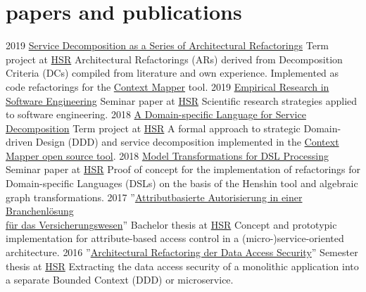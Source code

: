 \documentclass[]{cv-style}
\begin{document}
\section{papers and publications}

\begin{entrylist}
\entry
{2019}
{\href{https://eprints.hsr.ch/784/}{Service Decomposition as a Series of Architectural Refactorings}}
{Term project at \href{https://www.hsr.ch}{HSR}}
{Architectural Refactorings (ARs) derived from Decomposition Criteria (DCs) compiled from literature and own experience. Implemented as code refactorings for the \href{https://contextmapper.github.io/}{Context Mapper} tool.}
\entry
{2019}
{\href{https://github.com/stefan-ka/papers-and-publications/raw/master/empirical-research-in-software-engineering/FS19_SKapferer_Empirical-Research-in-Software-Engineering-Paper.pdf}{Empirical Research in Software Engineering}}
{Seminar paper at \href{https://www.hsr.ch}{HSR}}
{Scientific research strategies applied to software engineering.}
\entry
{2018}
{\href{https://eprints.hsr.ch/722/}{A Domain-specific Language for Service Decomposition}}
{Term project at \href{https://www.hsr.ch}{HSR}}
{A formal approach to strategic Domain-driven Design (DDD) and service decomposition implemented in the \href{https://contextmapper.github.io/}{Context Mapper open source tool}.}
\entry
{2018}
{\href{https://stefan.kapferer.ch/model-transformations-for-dsl-processing}{Model Transformations for DSL Processing}}
{Seminar paper at \href{https://www.hsr.ch}{HSR}}
{Proof of concept for the implementation of refactorings for Domain-specific Languages (DSLs) on the basis of the Henshin tool and algebraic graph transformations.}
\entry
{2017}
{''\href{https://eprints.hsr.ch/602/}{Attributbasierte Autorisierung in einer Branchenlösung\\für das Versicherungswesen}''}
{Bachelor thesis at \href{https://www.hsr.ch}{HSR}}
{Concept and prototypic implementation for attribute-based access control in a (micro-)service-oriented architecture.}
\entry
{2016}
{''\href{https://eprints.hsr.ch/564/}{Architectural Refactoring der Data Access Security}''}
{Semester thesis at \href{https://www.hsr.ch}{HSR}}
{Extracting the data access security of a monolithic application into a separate Bounded Context (DDD) or microservice.}
\end{entrylist}
\end{document}
